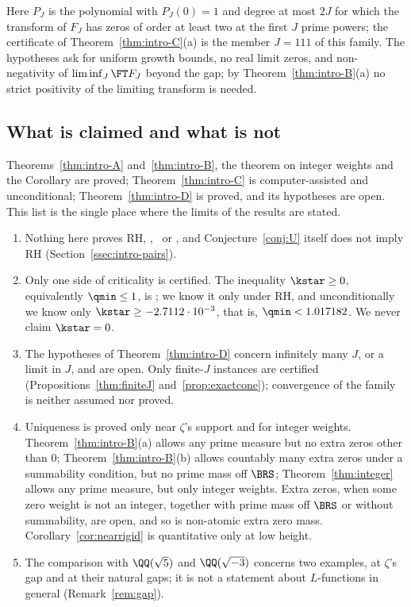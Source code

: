 Here $P_J$ is the polynomial with $P_J(0)=1$ and degree at most $2J$ for which the transform of $F_J$ has zeros of order at least two at the first $J$
prime powers; the certificate of Theorem~\ref{thm:intro-C}(a) is the member $J=111$ of this family. The hypotheses ask for uniform
growth bounds, no real limit zeros, and non-negativity of $\liminf_J\FT F_J$ beyond the gap; by Theorem~\ref{thm:intro-B}(a) no strict
positivity of the limiting transform is needed.

\subsection{What is claimed and what is not}\label{ssec:claims}

Theorems~\ref{thm:intro-A} and~\ref{thm:intro-B}, the theorem on integer weights and the Corollary are proved; Theorem~\ref{thm:intro-C} is computer-assisted and
unconditional; Theorem~\ref{thm:intro-D} is proved, and its hypotheses are open. This list is the single place where the limits of the
results are stated.
\begin{enumerate}[label=(\arabic*),leftmargin=*]
\item Nothing here proves RH, \condE, \condS\ or \condU, and Conjecture~\ref{conj:U} itself does not imply RH
(Section~\ref{ssec:intro-pairs}).
\item Only one side of criticality is certified. The inequality $\kstar\ge0$, equivalently $\qmin\le1$, is \condE; we know it only under
RH, and unconditionally we know only $\kstar\ge-2.7112\cdot10^{-3}$, that is, $\qmin<1.017182$. We never claim $\kstar=0$.
\item The hypotheses of Theorem~\ref{thm:intro-D} concern infinitely many $J$, or a limit in $J$, and are open. Only finite-$J$ instances
are certified (Propositions~\ref{thm:finiteJ} and~\ref{prop:exactcone}); convergence of the family is neither assumed nor proved.
\item Uniqueness is proved only near $\zeta$'s support and for integer weights. Theorem~\ref{thm:intro-B}(a) allows any prime measure but no
extra zeros other than $0$; Theorem~\ref{thm:intro-B}(b) allows countably many extra zeros under a summability condition, but no prime mass off
$\BRS$; Theorem~\ref{thm:integer} allows any prime measure, but only integer weights. Extra zeros, when some zero weight is not an integer,
together with prime mass off $\BRS$ or without summability, are open, and so is non-atomic extra zero mass. Corollary~\ref{cor:nearrigid} is quantitative only at
low height.
\item The comparison with $\QQ(\sqrt5)$ and $\QQ(\sqrt{-3})$ concerns two examples, at $\zeta$'s gap and at their natural gaps; it is not a
statement about $L$-functions in general (Remark~\ref{rem:gap}).
\end{enumerate}

